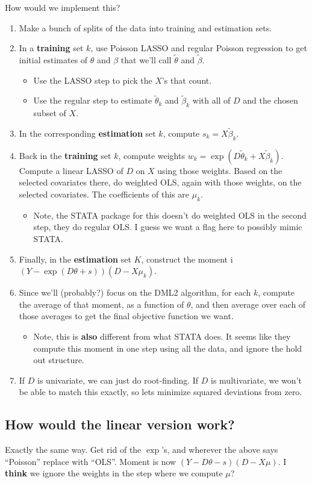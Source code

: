 \documentclass[11pt]{article}
\begin{document}
How would we implement this?
\begin{enumerate}
	\item Make a bunch of splits of the data into training and estimation sets. 
	\item In a \textbf{training} set $k$, use Poisson LASSO and regular Poisson regression to get initial estimates of $\theta$ and $\beta$ that we'll call $\widetilde{\theta}$ and $\widetilde{\beta}$.
		\begin{itemize}
			\item Use the LASSO step to pick the $X$'s that count.
			\item Use the regular step to estimate $\widetilde{\theta}_k$ and $\widetilde{\beta}_k$ with all of $D$ and the chosen subset of $X$.
		\end{itemize}
	\item In the corresponding \textbf{estimation} set $k$, compute $s_k = X \widetilde{\beta}_k$.
	\item Back in the \textbf{training} set $k$, compute weights $w_k = \exp(D\widetilde{\theta}_k + X\widetilde{\beta}_k)$.  Compute a linear LASSO of $D$ on $X$ using those weights.  Based on the selected covariates there, do weighted OLS, again with those weights, on the selected covariates.  The coefficients of this are $\mu_k$.
		\begin{itemize}
			\item Note, the STATA package for this doesn't do weighted OLS in the second step, they do regular OLS.  I guess we want a flag here to possibly mimic STATA.
		\end{itemize}
	\item Finally, in the \textbf{estimation} set $K$, construct the moment i$(Y - \exp(D\theta + s))(D - X\mu_k)$.
	\item Since we'll (probably?) focus on the DML2 algorithm, for each $k$, compute the average of that moment, as a function of $\theta$, and then average over each of those averages to get the final objective function we want.
		\begin{itemize}
			\item Note, this is \textbf{also} different from what STATA does.  It seems like they compute this moment in one step using all the data, and ignore the hold out structure.
		\end{itemize}
	\item If $D$ is univariate, we can just do root-finding.  If $D$ is multivariate, we won't be able to match this exactly, so lets minimize squared deviations from zero.   
\end{enumerate}
\subsection{How would the linear version work?}
Exactly the same way.  Get rid of the $\exp$'s, and wherever the above says ``Poisson'' replace with ``OLS''.  Moment is now $(Y - D\theta - s)(D - X\mu)$.  I \textbf{think} we ignore the weights in the step where we compute $\mu$?
\end{document}
